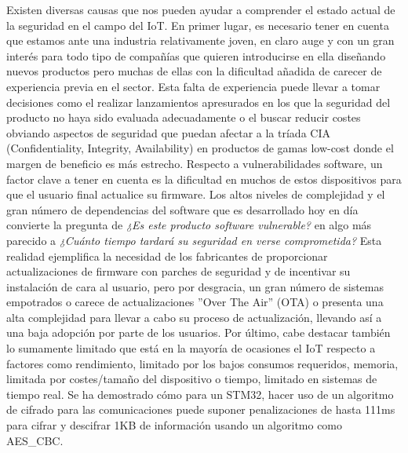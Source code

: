 Existen diversas causas que nos pueden ayudar a comprender el estado actual de la seguridad en el campo del IoT.
En primer lugar, es necesario tener en cuenta que estamos ante una industria relativamente 
joven, en claro auge y con un gran interés para todo tipo de compañías que quieren introducirse en ella diseñando 
nuevos productos pero muchas de ellas con la dificultad añadida de carecer de experiencia previa en el sector.
Esta falta de experiencia puede llevar a tomar decisiones como el realizar lanzamientos apresurados en los que la seguridad del producto no haya 
sido evaluada adecuadamente o el buscar reducir costes obviando aspectos de seguridad que puedan afectar a 
la tríada CIA (Confidentiality, Integrity, Availability) en productos de gamas low-cost donde el margen de beneficio 
es más estrecho. Respecto a vulnerabilidades software, un factor clave a tener en cuenta es la dificultad en muchos de estos 
dispositivos para que el usuario final actualice su firmware. Los altos niveles de complejidad y el gran número de dependencias del software
que es desarrollado hoy en día convierte la pregunta de \textit{¿Es este producto software vulnerable?} en algo más parecido a 
\textit{¿Cuánto tiempo tardará su seguridad en verse comprometida?} Esta realidad ejemplifica la necesidad de los fabricantes de 
proporcionar actualizaciones de firmware con parches de seguridad y de incentivar su instalación de cara al usuario, pero por 
desgracia, un gran número de sistemas empotrados o carece de actualizaciones ''Over The Air'' (OTA) o presenta una alta complejidad para 
llevar a cabo su proceso de actualización, llevando así a una baja adopción por parte de los usuarios.
Por último, cabe destacar también lo sumamente limitado que está en la mayoría de ocasiones el IoT respecto a factores como 
rendimiento, limitado por los bajos consumos requeridos, memoria, limitada por costes/tamaño del dispositivo o tiempo, limitado en sistemas de tiempo real. 
Se ha demostrado cómo para un STM32, hacer uso de un algoritmo de cifrado para las comunicaciones puede suponer 
penalizaciones de hasta 111ms\cite{performance} para cifrar y descifrar 1KB de información usando un algoritmo como AES\_CBC.\bigskip

